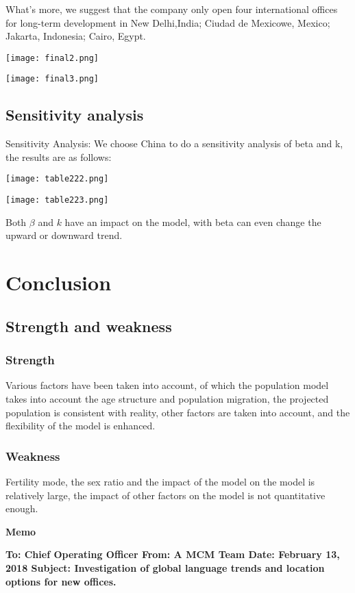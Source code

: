 \documentclass{mcmthesis}
\begin{document}
What's more, we suggest that the company only open four international offices for long-term development in New Delhi,India; Ciudad de Mexicowe, Mexico; Jakarta, Indonesia; Cairo, Egypt.



\newpage

\texttt{[image: final2.png]}


\texttt{[image: final3.png]}


\subsection{Sensitivity analysis}

Sensitivity Analysis: We choose China to do a sensitivity analysis of beta and k, the results are as follows:

\texttt{[image: table222.png]}


\texttt{[image: table223.png]}

Both $\beta$ and $k$ have an impact on the model, with beta can even change the upward or downward trend.

\section{Conclusion}
\subsection{Strength and weakness}
 \subsubsection{Strength}
Various factors have been taken into account, of which the population model takes into account the age structure and population migration, the projected population is consistent with reality, other factors are taken into account, and the flexibility of the model is enhanced.

 \subsubsection{Weakness}
Fertility mode, the sex ratio and the impact of the model on the model is relatively large, the impact of other factors on the model is not quantitative enough.


\newpage

\textbf{Memo}


\textbf{To: Chief Operating Officer
From: A MCM Team
Date: February 13, 2018
Subject: Investigation of global language trends and location options for new offices.
}
\end{document}
